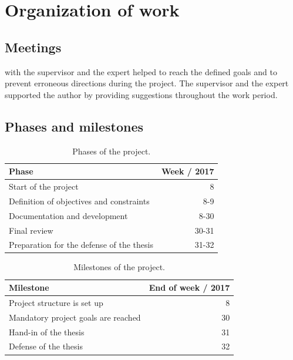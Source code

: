 \documentclass[%
    a4paper,    %
    justified,  %
    nobib,      %
    openany     %
]{tufte-book}
\makeatletter
\renewcommand{\label}[1]{\@tufte@label{##1}}%
\makeatother
\begin{document}
\section{Organization of work}
\label{sec:organization-of-work}

\subsection{Meetings}
\label{subsec:meetings}

 with the supervisor and the expert helped to reach
the defined goals and to prevent erroneous directions during the project. The
supervisor and the expert supported the author by providing suggestions
throughout the work period. 

\subsection{Phases and milestones}
\label{subsec:project-phases-milestones}

\begin{table}[h]
  \caption{Phases of the project.}
  \begin{tabularx}{\textwidth}{Xr}
    \toprule
    \textbf{Phase}   & \textbf{Week / 2017} \\
    \midrule
    Start of the project & 8 \\
    Definition of objectives and constraints & 8-9 \\
    Documentation and development & 8-30 \\
    Final review & 30-31 \\
    Preparation for the defense of the thesis & 31-32 \\
    \bottomrule
  \end{tabularx}
\end{table}

\begin{table}[h]
  \caption{Milestones of the project.}
  \begin{tabularx}{\textwidth}{Xr}
    \toprule
    \textbf{Milestone}   & \textbf{End of week / 2017} \\
    \midrule
    Project structure is set up & 8 \\
    Mandatory project goals are reached & 30 \\
    Hand-in of the thesis & 31 \\
    Defense of the thesis & 32 \\
    \bottomrule
  \end{tabularx}
\end{table}
\end{document}
